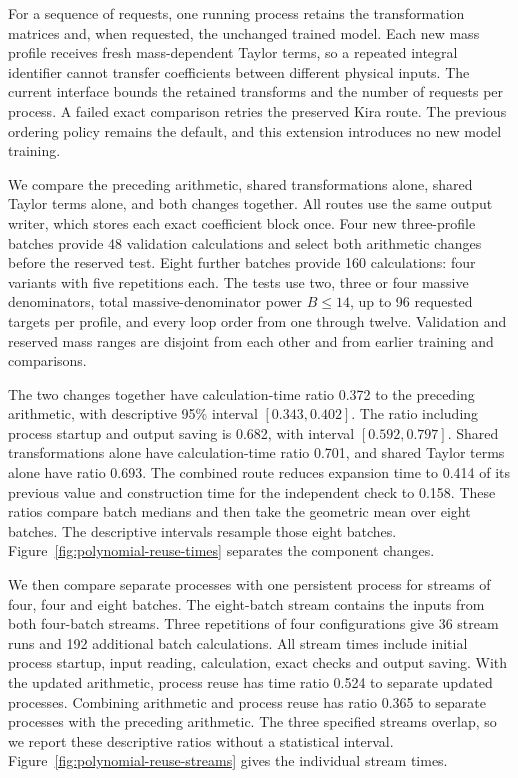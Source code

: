 For a sequence of requests, one running process retains the transformation
matrices and, when requested, the unchanged trained model.
Each new mass profile receives fresh mass-dependent Taylor terms, so
a repeated integral identifier cannot transfer coefficients between
different physical inputs. The current interface bounds the retained
transforms and the number of requests per process. A failed exact
comparison retries the preserved Kira route. The previous ordering
policy remains the default, and this extension introduces no new model
training.

We compare the preceding arithmetic, shared transformations alone,
shared Taylor terms alone, and both changes together.
All routes use the same output writer, which stores each exact coefficient
block once. Four new three-profile batches provide 48 validation
calculations and select both arithmetic changes before the reserved test.
Eight further batches provide 160 calculations: four variants with five
repetitions each. The tests use two, three or four massive denominators,
total massive-denominator power \(B\leq14\), up to 96 requested targets
per profile, and every
loop order from one through twelve. Validation and reserved mass ranges
are disjoint from each other and from earlier training and comparisons.

The two changes together have calculation-time ratio 0.372 to the
preceding arithmetic, with descriptive 95\% interval \([0.343,0.402]\).
The ratio including process startup and output saving is 0.682,
with interval \([0.592,0.797]\). Shared transformations alone have
calculation-time ratio 0.701, and shared Taylor terms alone have
ratio 0.693. The combined route reduces expansion time to
0.414 of its previous value and construction time for the
independent check to 0.158.
These ratios compare batch medians and then take the geometric mean over
eight batches. The descriptive intervals resample those eight batches.
Figure~\ref{fig:polynomial-reuse-times} separates the component changes.

We then compare separate processes with one persistent process for streams
of four, four and eight batches. The eight-batch stream contains the
inputs from both four-batch streams. Three repetitions of four
configurations give 36 stream runs and 192 additional batch calculations.
All stream times include initial process startup, input reading,
calculation, exact checks and output saving.
With the updated arithmetic, process reuse has time ratio 0.524
to separate updated processes. Combining arithmetic and process reuse
has ratio 0.365 to separate processes with the preceding arithmetic.
The three specified streams overlap, so we report these descriptive
ratios without a statistical interval.
Figure~\ref{fig:polynomial-reuse-streams} gives the individual stream times.

